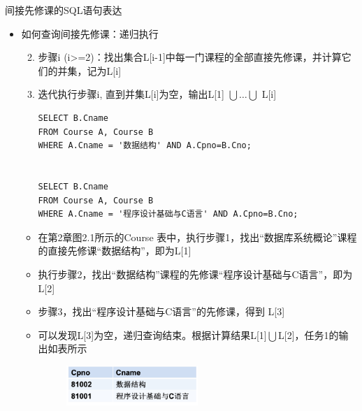 \begin{frame}{间接先修课的SQL语句表达}
\begin{itemize}
\item 如何查询间接先修课：递归执行

\begin{enumerate}
 \setcounter{enumi}{1}
\item 步骤i (i>=2)：找出集合L[i-1]中每一门课程的全部直接先修课，并计算它们的并集，记为L[i]
\item 迭代执行步骤i, 直到并集L[i]为空，输出L[1] $\bigcup \dots \bigcup$ L[i]

\begin{block}{}
\begin{lstlisting}
SELECT B.Cname 
FROM Course A, Course B
WHERE A.Cname = '数据结构' AND A.Cpno=B.Cno;


SELECT B.Cname 
FROM Course A, Course B
WHERE A.Cname = '程序设计基础与C语言' AND A.Cpno=B.Cno;
\end{lstlisting}
\end{block} 

\end{enumerate}


\begin{itemize}
    \item 在第2章图2.1所示的Course 表中，执行步骤1，找出“数据库系统概论”课程的直接先修课“数据结构”，即为L[1]
    \item 执行步骤2，找出“数据结构”课程的先修课“程序设计基础与C语言”，即为L[2]
    \item 步骤3，找出“程序设计基础与C语言”的先修课，得到 L[3]
    \item 可以发现L[3]为空，递归查询结束。根据计算结果L[1]$\bigcup$L[2]，任务1的输出如表所示

   \begin{figure}
        \centering
        \includegraphics[width=0.5\textwidth]{figure/fig-3.jpg}
    \end{figure}

\end{itemize}

\end{itemize}
\end{frame}




